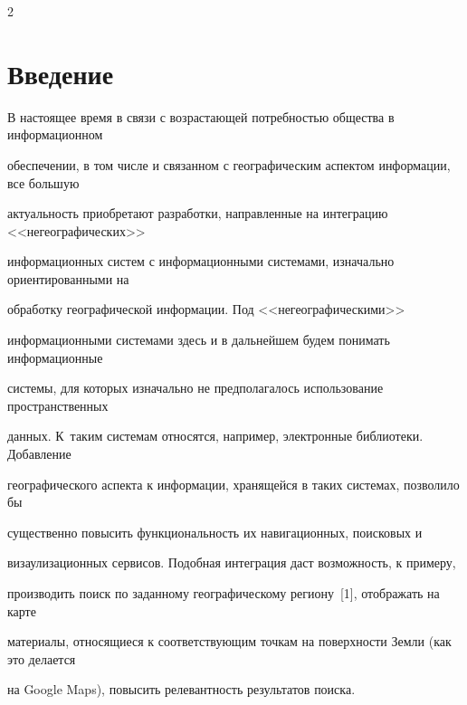   

  




      \thispagestyle{headings}



      \begin{multicols}{2}



            \label{st\stat}





  \section{Введение}

  

  В настоящее время в связи с возрастающей потребностью общества в информационном 

обеспечении, в том числе и связанном с географическим аспектом информации, все большую 

актуальность приобретают разработки, направленные на интеграцию <<негеографических>> 

информационных сис\-тем с информационными сис\-те\-ма\-ми, изначально ориентированными на 

обработку географической информации. Под <<негеографическими>> 

информационными системами здесь и в дальнейшем будем понимать информационные 

системы, для которых изначально не предполагалось использование пространственных 

данных. К~таким сис\-те\-мам относятся, например, электронные биб\-лио\-те\-ки. Добавление 

географического аспекта к информации, хранящейся в таких системах, позволило бы 

существенно повысить функциональность их навигационных, поисковых и 

визаулизационных сервисов. Подобная интеграция даст возможность, к примеру, 

производить поиск по заданному географическому региону~[1], отображать на карте 

материалы, относящиеся к соответствующим точкам на поверхности Земли (как это делается 

на {Google Maps}), повысить релевантность результатов поиска.

  


\end{multicols}
